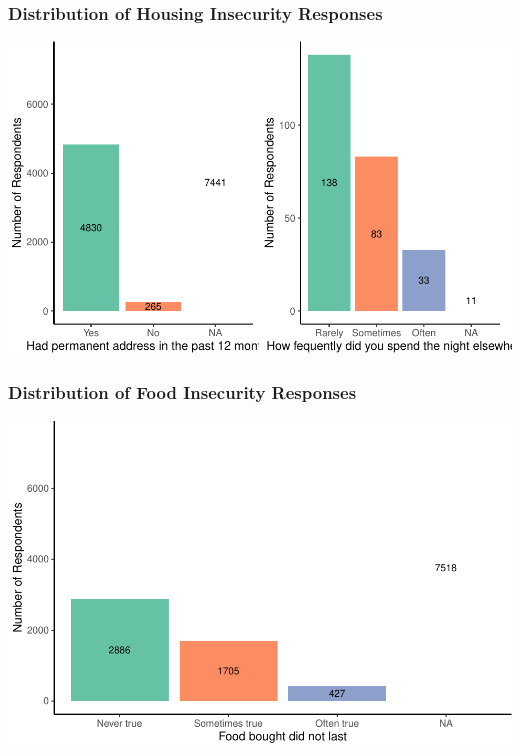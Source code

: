 \documentclass[
  10pt,
]{article}
\begin{document}
\hypertarget{distribution-of-housing-insecurity-responses}{%
\subsubsection{Distribution of Housing Insecurity Responses}\label{distribution-of-housing-insecurity-responses}}

\includegraphics{phase1_report_files/figure-latex/unnamed-chunk-4-1}

\hypertarget{distribution-of-food-insecurity-responses}{%
\subsubsection{Distribution of Food Insecurity Responses}\label{distribution-of-food-insecurity-responses}}

\includegraphics{phase1_report_files/figure-latex/unnamed-chunk-6-1}
\end{document}
